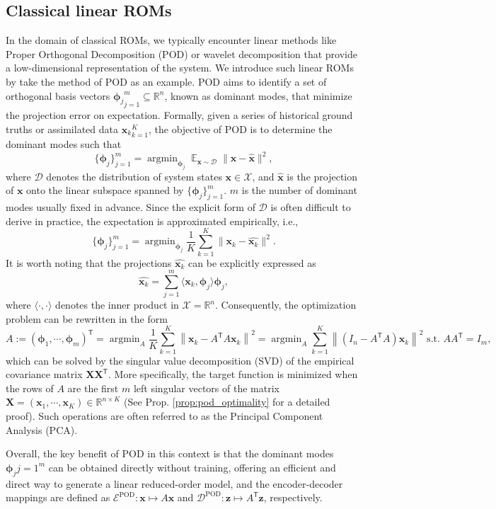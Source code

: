 \documentclass{article}
\newcommand{\mR}{\mathbb{R}}
\newcommand{\trans}{\mathsf{T}}
\newcommand{\mX}{\mathcal{X}}
\newcommand{\mE}{\mathcal{E}}
\newcommand{\mD}{\mathcal{D}}
\DeclareMathOperator*{\argmin}{argmin}
\DeclareMathOperator*{\mbE}{\mathbb{E}}
\begin{document}
\subsection{Classical linear ROMs}\label{sec:linear-encoders}
In the domain of classical ROMs, we typically encounter linear methods like Proper Orthogonal Decomposition (POD) or wavelet decomposition that provide a low-dimensional representation of the system. We introduce such linear ROMs by take the method of POD as an example. POD aims to identify a set of orthogonal basis vectors ${\bm\phi_j}_{j=1}^m\subseteq\mR^n$, known as dominant modes, that minimize the projection error on expectation. Formally, given a series of historical ground truths or assimilated data ${\bm x_k}_{k=1}^K$, the objective of POD is to determine the dominant modes such that
\[\{\bm\phi_j\}_{j=1}^m=\argmin_{\bm\phi_j}\mbE_{\bm x\sim\mathscr{D}}\|\bm x-\widehat{\bm x}\|^2,\]
where $\mathscr{D}$ denotes the distribution of system states $\bm x\in\mX$, and $\widehat{\bm x}$ is the projection of $\bm x$ onto the linear subspace spanned by $\{\bm\phi_j\}_{j=1}^m$. $m$ is the number of dominant modes usually fixed in advance. Since the explicit form of $\mathscr{D}$ is often difficult to derive in practice, the expectation is approximated empirically, i.e.,
\[\{\bm\phi_j\}_{j=1}^m=\argmin_{\bm\phi_j}\frac1K\sum_{k=1}^K\|\bm x_k-\widehat{\bm x_k}\|^2.\]
It is worth noting that the projections $\widehat{\bm x_k}$ can be explicitly expressed as
\[\widehat{\bm x_k}=\sum_{j=1}^m\langle\bm x_k,\bm\phi_j\rangle\bm\phi_j,\]
where $\langle\cdot,\cdot\rangle$ denotes the inner product in $\mX=\mR^n$. Consequently, the optimization problem can be rewritten in the form
\[A:=(\bm\phi_1,\cdots,\bm\phi_m)^\trans=\argmin_A\frac1K\sum_{k=1}^K\left\|\bm x_k-A^\trans A\bm x_k\right\|^2=\argmin_A\sum_{k=1}^K\left\|\left(I_n-A^\trans A\right)\bm x_k\right\|^2\textrm{ s.t. }AA^\trans =I_m,\]
which can be solved by the singular value decomposition (SVD) of the empirical covariance matrix $\bm X\bm X^\trans$. More specifically, the target function is minimized when the rows of $A$ are the first $m$ left singular vectors of the matrix $\bm X=(\bm x_1,\cdots,\bm x_K)\in\mR^{n\times K}$ (See Prop. \ref{prop:pod_optimality} for a detailed proof). Such operations are often referred to as the Principal Component Analysis (PCA).

Overall, the key benefit of POD in this context is that the dominant modes ${\bm\phi_j}{j=1}^m$ can be obtained directly without training, offering an efficient and direct way to generate a linear reduced-order model, and the encoder-decoder mappings are defined as $\mE^{\textrm{POD}}:\bm x\mapsto A\bm x$ and $\mD^{\textrm{POD}}:\bm z\mapsto A^\trans\bm z$, respectively.
\end{document}
